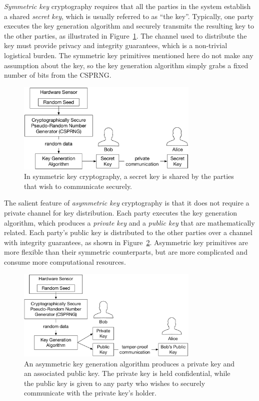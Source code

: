 \textit{Symmetric key} cryptography requires that all the parties in the system
establish a shared \textit{secret key}, which is usually referred to as ``the
key''. Typically, one party executes the key generation algorithm and securely
transmits the resulting key to the other parties, as illustrated in
Figure~\ref{fig:symmetric_key_generation}. The channel used to
distribute the key must provide privacy and integrity guarantees, which is a
non-trivial logistical burden. The symmetric key primitives mentioned here do
not make any assumption about the key, so the key generation algorithm simply
grabs a fixed number of bits from the CSPRNG.

\begin{figure}[hbt]
  \centering
  \includegraphics[width=87mm]{figures/symmetric_key_generation.pdf}
  \caption{
    In symmetric key cryptography, a secret key is shared by the parties that
    wish to communicate securely.
  }
  \label{fig:symmetric_key_generation}
\end{figure}

The salient feature of \textit{asymmetric key} cryptography is that it does not
require a private channel for key distribution. Each party executes the key
generation algorithm, which produces a \textit{private key} and a
\textit{public key} that are mathematically related. Each party's public key
is distributed to the other parties over a channel with integrity guarantees,
as shown in Figure~\ref{fig:asymmetric_key_generation}.
Asymmetric key primitives are more flexible than their symmetric counterparts,
but are more complicated and consume more computational resources.

\begin{figure}[hbt]
  \centering
  \includegraphics[width=87mm]{figures/asymmetric_key_generation.pdf}
  \caption{
    An asymmetric key generation algorithm produces a private key and an
    associated public key. The private key is held confidential, while the
    public key is given to any party who wishes to securely communicate with
    the private key's holder.
  }
  \label{fig:asymmetric_key_generation}
\end{figure}


